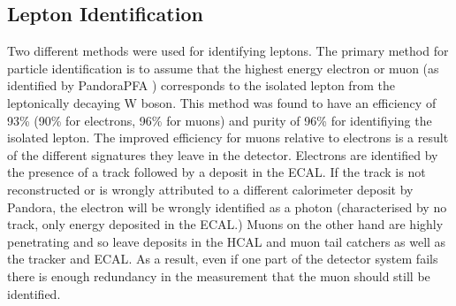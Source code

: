 \subsection{Lepton Identification}
Two different methods were used for identifying leptons. The primary method for particle identification is to assume that the highest energy electron or muon (as identified by PandoraPFA \cite{Thomson200925}) corresponds to the isolated lepton from the leptonically decaying W boson. This method was found to have an efficiency of 93\% (90\% for electrons, 96\% for muons) and purity of 96\% for identifiying the isolated lepton. The improved efficiency for muons relative to electrons is a result of the different signatures they leave in the detector. Electrons are identified by the presence of a track followed by a deposit in the \ac{ECAL}. If the track is not reconstructed or is wrongly attributed to a different calorimeter deposit by Pandora, the electron will be wrongly identified as a photon (characterised by no track, only energy deposited in the \ac{ECAL}.) Muons on the other hand are highly penetrating and so leave deposits in the \ac{HCAL} and muon tail catchers as well as the tracker and \ac{ECAL}. As a result, even if one part of the detector system fails there is enough redundancy in the measurement that the muon should still be identified.

